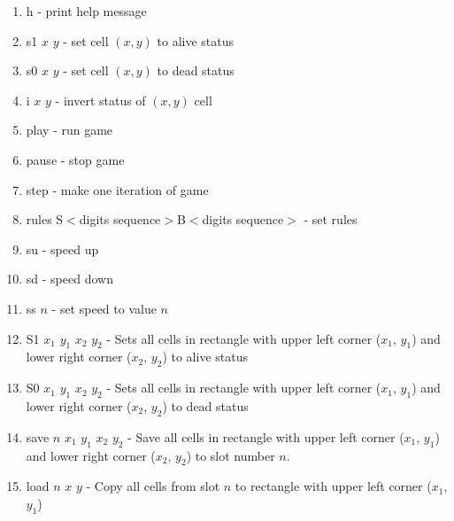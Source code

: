 \begin{enumerate}
	\item \textsf{h} - print help message
	\item \textsf{s1 $x$ $y$} - set cell $(x, y)$ to alive status
	\item \textsf{s0 $x$ $y$} - set cell $(x, y)$ to dead status
	\item \textsf{i $x$ $y$} - invert status of $(x, y)$ cell
	\item \textsf{play} - run game
	\item \textsf{pause} - stop game
	\item \textsf{step} - make one iteration of game
	\item \textsf{rules S$<$digits sequence$>$B$<$digits sequence$>$} - set rules
	\item \textsf{su} - speed up
	\item \textsf{sd} - speed down
	\item \textsf{ss $n$} - set speed to value $n$
	\item \textsf{S1 $x_{1}$ $y_{1}$ $x_{2}$ $y_{2}$} -  Sets all cells in rectangle with upper left corner ($x_{1}$, $y_{1}$) and lower right corner ($x_{2}$, $y_{2}$) to alive status
	\item \textsf{S0 $x_{1}$ $y_{1}$ $x_{2}$ $y_{2}$} -  Sets all cells in rectangle with upper left corner ($x_{1}$, $y_{1}$) and lower right corner ($x_{2}$, $y_{2}$) to dead status
	\item \textsf{save $n$ $x_{1}$ $y_{1}$ $x_{2}$ $y_{2}$} - Save all cells in rectangle with upper left corner ($x_{1}$, $y_{1}$) and lower right corner ($x_{2}$, $y_{2}$) to slot number $n$.
	\item \textsf{load $n$ $x$ $y$} - Copy all cells from slot $n$ to rectangle with upper left corner ($x_{1}$, $y_{1}$)
\end{enumerate}
